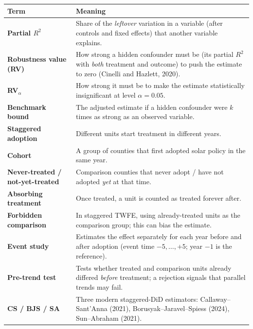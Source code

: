\documentclass[11pt]{article}
\begin{document}
\begin{table}[H]\centering\small
\begin{tabularx}{\linewidth}{>{\bfseries}l>{\raggedright\arraybackslash}X}
\toprule
Term & Meaning\\
\midrule
Partial $R^2$ & Share of the \emph{leftover} variation in a variable (after controls and fixed effects) that another variable explains.\\
Robustness value (RV) & How strong a hidden confounder must be (its partial $R^2$ with \emph{both} treatment and outcome) to push the estimate to zero (Cinelli and Hazlett, 2020).\\
RV$_\alpha$ & How strong it must be to make the estimate statistically insignificant at level $\alpha=0.05$.\\
Benchmark bound & The adjusted estimate if a hidden confounder were $k$ times as strong as an observed variable.\\
Staggered adoption & Different units start treatment in different years.\\
Cohort & A group of counties that first adopted solar policy in the same year.\\
Never-treated / not-yet-treated & Comparison counties that never adopt / have not adopted \emph{yet} at that time.\\
Absorbing treatment & Once treated, a unit is counted as treated forever after.\\
Forbidden comparison & In staggered TWFE, using already-treated units as the comparison group; this can bias the estimate.\\
Event study & Estimates the effect separately for each year before and after adoption (event time $-5,\dots,+5$; year $-1$ is the reference).\\
Pre-trend test & Tests whether treated and comparison units already differed \emph{before} treatment; a rejection signals that parallel trends may fail.\\
CS / BJS / SA & Three modern staggered-DiD estimators: Callaway--Sant'Anna (2021), Borusyak--Jaravel--Spiess (2024), Sun--Abraham (2021).\\
\bottomrule
\end{tabularx}
\end{table}
\end{document}
